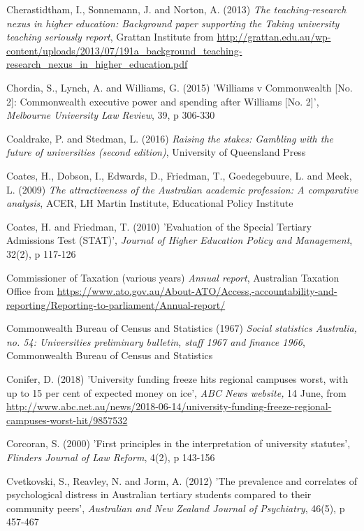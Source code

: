 \documentclass[]{book}
\begin{document}
Cherastidtham, I., Sonnemann, J. and Norton, A. (2013) \emph{The teaching-research nexus in higher education: Background paper supporting the Taking university teaching seriously report}, Grattan Institute from \url{http://grattan.edu.au/wp-content/uploads/2013/07/191a_background_teaching-research_nexus_in_higher_education.pdf}

Chordia, S., Lynch, A. and Williams, G. (2015) 'Williams v Commonwealth {[}No. 2{]}: Commonwealth executive power and spending after Williams {[}No. 2{]}', \emph{Melbourne University Law Review}, 39, p 306-330

Coaldrake, P. and Stedman, L. (2016) \emph{Raising the stakes: Gambling with the future of universities (second edition)}, University of Queensland Press

Coates, H., Dobson, I., Edwards, D., Friedman, T., Goedegebuure, L. and Meek, L. (2009) \emph{The attractiveness of the Australian academic profession: A comparative analysis}, ACER, LH Martin Institute, Educational Policy Institute

Coates, H. and Friedman, T. (2010) 'Evaluation of the Special Tertiary Admissions Test (STAT)', \emph{Journal of Higher Education Policy and Management}, 32(2), p 117-126

\protect\hypertarget{_ENREF_48}{}{}Commissioner of Taxation (various years) \emph{Annual report}, Australian Taxation Office from \url{https://www.ato.gov.au/About-ATO/Access,-accountability-and-reporting/Reporting-to-parliament/Annual-report/}

Commonwealth Bureau of Census and Statistics (1967) \emph{Social statistics Australia, no. 54: Universities preliminary bulletin, staff 1967 and finance 1966}, Commonwealth Bureau of Census and Statistics

Conifer, D. (2018) 'University funding freeze hits regional campuses worst, with up to 15 per cent of expected money on ice', \emph{ABC News website,} 14 June, from \url{http://www.abc.net.au/news/2018-06-14/university-funding-freeze-regional-campuses-worst-hit/9857532}

Corcoran, S. (2000) 'First principles in the interpretation of university statutes', \emph{Flinders Journal of Law Reform}, 4(2), p 143-156

Cvetkovski, S., Reavley, N. and Jorm, A. (2012) 'The prevalence and correlates of psychological distress in Australian tertiary students compared to their community peers', \emph{Australian and New Zealand Journal of Psychiatry}, 46(5), p 457-467
\end{document}
